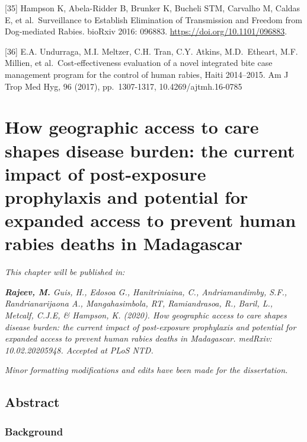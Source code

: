 \documentclass[
  oneside]{book}
\begin{document}
{[}35{]} Hampson K, Abela-Ridder B, Brunker K, Bucheli STM, Carvalho M, Caldas E, et al.~Surveillance to Establish Elimination of Transmission and Freedom from Dog-mediated Rabies. bioRxiv 2016: 096883. \url{https://doi.org/10.1101/096883}.

{[}36{]} E.A. Undurraga, M.I. Meltzer, C.H. Tran, C.Y. Atkins, M.D.~Etheart, M.F. Millien, et al.~Cost-effectiveness evaluation of a novel integrated bite case management program for the control of human rabies, Haiti 2014--2015. Am J Trop Med Hyg, 96 (2017), pp.~1307-1317, 10.4269/ajtmh.16-0785

\hypertarget{how-geographic-access-to-care-shapes-disease-burden-the-current-impact-of-post-exposure-prophylaxis-and-potential-for-expanded-access-to-prevent-human-rabies-deaths-in-madagascar}{%
\chapter{How geographic access to care shapes disease burden: the current impact of post-exposure prophylaxis and potential for expanded access to prevent human rabies deaths in Madagascar}\label{how-geographic-access-to-care-shapes-disease-burden-the-current-impact-of-post-exposure-prophylaxis-and-potential-for-expanded-access-to-prevent-human-rabies-deaths-in-madagascar}}

\emph{This chapter will be published in:}

\emph{\textbf{Rajeev, M.} Guis, H., Edosoa G., Hanitriniaina, C., Andriamandimby, S.F., Randrianarijaona A., Mangahasimbola, RT, Ramiandrasoa, R., Baril, L., Metcalf, C.J.E, \& Hampson, K. (2020). How geographic access to care shapes disease burden: the current impact of post-exposure prophylaxis and potential for expanded access to prevent human rabies deaths in Madagascar. medRxiv: 10.02.20205948. Accepted at PLoS NTD.}

\emph{Minor formatting modifications and edits have been made for the dissertation.}

\newpage
\setlength{\parskip}{2em}

\hypertarget{abstract-1}{%
\section*{Abstract}\label{abstract-1}}

\hypertarget{background}{%
\subsection*{Background}\label{background}}
\end{document}
